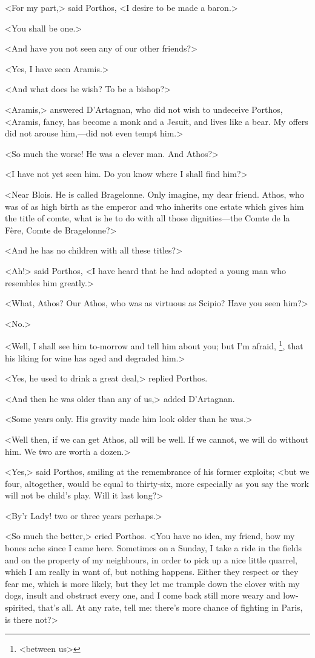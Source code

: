 <For my part,> said Porthos, <I desire to be made a baron.>

<You shall be one.>

<And have you not seen any of our other friends?>

<Yes, I have seen Aramis.>

<And what does he wish? To be a bishop?>

<Aramis,> answered D'Artagnan, who did not wish to undeceive Porthos, <Aramis, fancy, has become a monk and a Jesuit, and lives like a bear. My offers did not arouse him,—did not even tempt him.>

<So much the worse! He was a clever man. And Athos?>

<I have not yet seen him. Do you know where I shall find him?>

<Near Blois. He is called Bragelonne. Only imagine, my dear friend. Athos, who was of as high birth as the emperor and who inherits one estate which gives him the title of comte, what is he to do with all those dignities—the Comte de la Fère, Comte de Bragelonne?>

<And he has no children with all these titles?>

<Ah!> said Porthos, <I have heard that he had adopted a young man who resembles him greatly.>

<What, Athos? Our Athos, who was as virtuous as Scipio? Have you seen him?>

<No.>

<Well, I shall see him to-morrow and tell him about you; but I'm afraid, \footnote{<between us>}, that his liking for wine has aged and degraded him.>

<Yes, he used to drink a great deal,> replied Porthos.

<And then he was older than any of us,> added D'Artagnan.

<Some years only. His gravity made him look older than he was.>

<Well then, if we can get Athos, all will be well. If we cannot, we will do without him. We two are worth a dozen.>

<Yes,> said Porthos, smiling at the remembrance of his former exploits; <but we four, altogether, would be equal to thirty-six, more especially as you say the work will not be child's play. Will it last long?>

<By'r Lady! two or three years perhaps.>

<So much the better,> cried Porthos. <You have no idea, my friend, how my bones ache since I came here. Sometimes on a Sunday, I take a ride in the fields and on the property of my neighbours, in order to pick up a nice little quarrel, which I am really in want of, but nothing happens. Either they respect or they fear me, which is more likely, but they let me trample down the clover with my dogs, insult and obstruct every one, and I come back still more weary and low-spirited, that's all. At any rate, tell me: there's more chance of fighting in Paris, is there not?>


